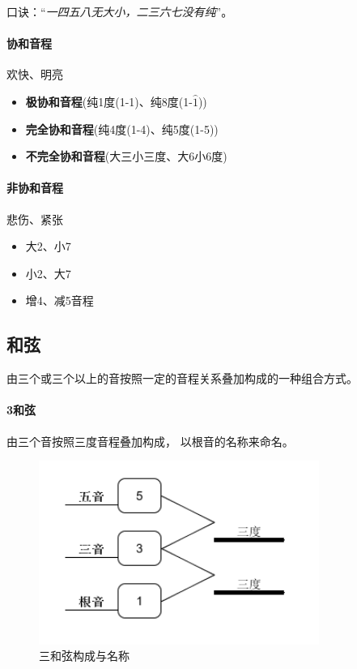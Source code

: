 \documentclass[UTF8,a4paper,12pt]{ctexbook}
\begin{document}
			口诀：“\textit{一四五八无大小，二三六七没有纯}”。
			
			\paragraph{协和音程}欢快、明亮
				\begin{itemize}[itemindent = 1em]
					\item \textbf{极协和音程}(纯1度(1-1)、纯8度(1-$\hat{1}$))
					\item \textbf{完全协和音程}(纯4度(1-4)、纯5度(1-5))
					\item \textbf{不完全协和音程}(大三小三度、大6小6度)
				\end{itemize}
				
			
			
			\paragraph{非协和音程}悲伤、紧张
				\begin{itemize}[itemindent = 1em]
					\item 大2、小7
					\item 小2、大7
					\item 增4、减5音程
				\end{itemize}
		
		
		\subsection{和弦}
			由三个或三个以上的音按照一定的音程关系叠加构成的一种组合方式。	
			
			\paragraph{3和弦}
				由三个音按照三度音程叠加构成， 以根音的名称来命名。
				
				\begin{figure}[H]
					\centering
					\includegraphics[height=6cm]{sanhexian}
					\caption{三和弦构成与名称}
				\end{figure}
				
\end{document}
